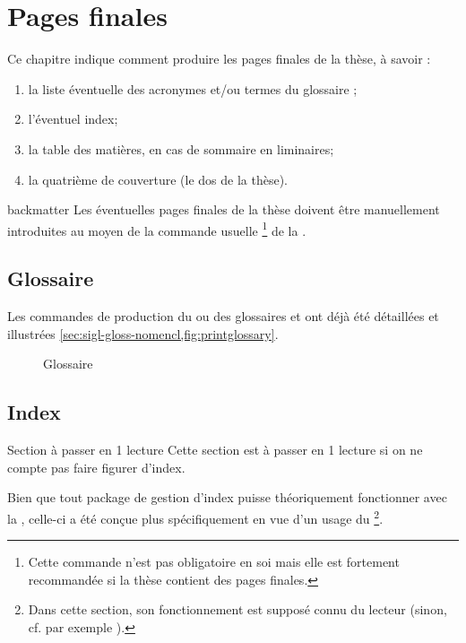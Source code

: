 \chapter{Pages finales}
\label{cha:pages-finales}

Ce chapitre indique comment produire les pages finales de la thèse,
à savoir :
\begin{enumerate}
\item la liste éventuelle des acronymes et/ou
  termes du glossaire ;
\item l'éventuel index;
\item la table des matières, en cas de sommaire en \glspl{liminaire};
\item la quatrième de couverture (le dos de la thèse).
\end{enumerate}

\begin{docCommand}{backmatter}{}
  Les éventuelles pages finales de la thèse doivent être manuellement
  introduites au moyen de la commande usuelle
  \footnote{Cette commande n'est pas obligatoire en
    soi mais elle est fortement recommandée si la thèse contient des pages
    finales.} de la \nofrontmatter.
\end{docCommand}

\section{Glossaire}

Les commandes de production du ou des glossaires 
et  ont déjà été détaillées et illustrées
\vref{sec:sigl-gloss-nomencl,fig:printglossary}.

\begin{figure}[htbp]
  \centering
  \caption{Glossaire}
  \label{fig:printglossary}
\end{figure}

\section{Index}

\begin{dbremark*}{Section à passer en 1\iere{} lecture}
  Cette section est à passer en 1\iere{} lecture si on ne compte pas faire
  figurer d'index.
\end{dbremark*}

Bien que tout package de gestion d'index puisse théoriquement fonctionner avec
la \yatcl, celle-ci a été conçue plus spécifiquement en vue d'un usage du
\footnote{Dans cette section, son fonctionnement est supposé
  connu du lecteur (sinon, cf. par exemple \cite{en-ligne7}).}.

